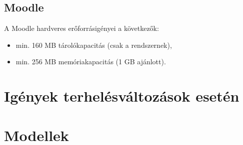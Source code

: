
\subsection{Moodle}
A Moodle hardveres erőforrásigényei a következők:
\begin{itemize}
\item min. 160 MB tárolókapacitás (csak a rendszernek),
\item min. 256 MB memóriakapacitás (1 GB ajánlott).
\end{itemize}


\section{Igények terhelésváltozások esetén}
\todo{}
\section{Modellek}
\todo{}
